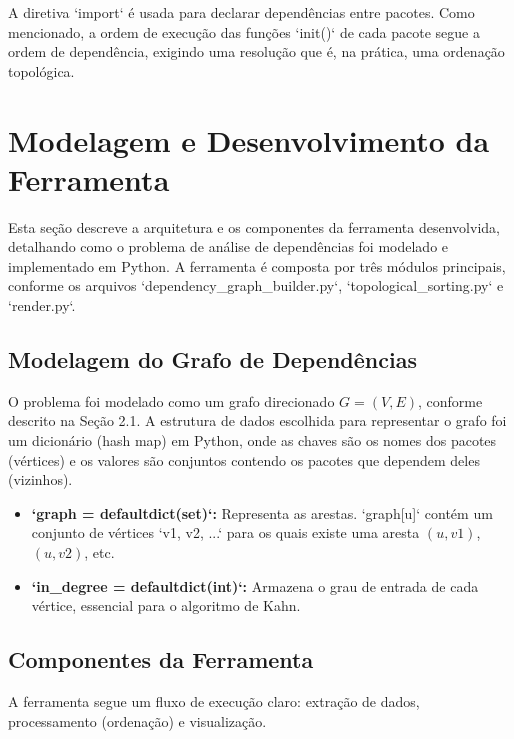 \documentclass[12pt]{article}
\begin{document}
A diretiva `import` é usada para declarar dependências entre pacotes. Como mencionado, a ordem de execução das funções `init()` de cada pacote segue a ordem de dependência, exigindo uma resolução que é, na prática, uma ordenação topológica.

\section{Modelagem e Desenvolvimento da Ferramenta}
Esta seção descreve a arquitetura e os componentes da ferramenta desenvolvida, detalhando como o problema de análise de
dependências foi modelado e implementado em Python. A ferramenta é composta por três módulos principais, conforme os
arquivos `dependency{\_}graph{\_}builder.py`, `topological{\_}sorting.py` e `render.py`.

\subsection{Modelagem do Grafo de Dependências}
O problema foi modelado como um grafo direcionado $G = (V, E)$, conforme descrito na Seção 2.1. A estrutura de dados escolhida para representar o grafo foi um dicionário (hash map) em Python, onde as chaves são os nomes dos pacotes (vértices) e os valores são conjuntos contendo os pacotes que dependem deles (vizinhos).

\begin{itemize}
    \item \textbf{`graph = defaultdict(set)`:} Representa as arestas. `graph[u]` contém um conjunto de vértices `{v1, v2, ...}` para os quais existe uma aresta $(u, v1)$, $(u, v2)$, etc.
    \item \textbf{`in\_degree = defaultdict(int)`:} Armazena o grau de entrada de cada vértice, essencial para o algoritmo de Kahn.
\end{itemize}

\subsection{Componentes da Ferramenta}
A ferramenta segue um fluxo de execução claro: extração de dados, processamento (ordenação) e visualização.
\end{document}
